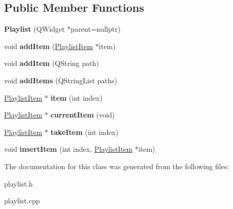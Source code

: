 \subsection*{Public Member Functions}
\begin{DoxyCompactItemize}
\item 
\mbox{\label{classPlaylist_a1a38dac71a234491bc933bd5089c54b0}} 
{\bfseries Playlist} (Q\+Widget $\ast$parent=nullptr)
\item 
\mbox{\label{classPlaylist_a1277d4881eeaad2562ff883fa7b90833}} 
void {\bfseries add\+Item} (\hyperlink{classPlaylistItem}{Playlist\+Item} $\ast$item)
\item 
\mbox{\label{classPlaylist_a1a8512bea74f92bac13d8827dec1a6ac}} 
void {\bfseries add\+Item} (Q\+String path)
\item 
\mbox{\label{classPlaylist_a0b6ccc713cf25550bc5fac2cef666e5d}} 
void {\bfseries add\+Items} (Q\+String\+List paths)
\item 
\mbox{\label{classPlaylist_a31b754a62bccbd79b6a5320d02ca50f3}} 
\hyperlink{classPlaylistItem}{Playlist\+Item} $\ast$ {\bfseries item} (int index)
\item 
\mbox{\label{classPlaylist_a9fb676932435eb9c599d82e1e0e2e919}} 
\hyperlink{classPlaylistItem}{Playlist\+Item} $\ast$ {\bfseries current\+Item} (void)
\item 
\mbox{\label{classPlaylist_af38010d3b29b01bfd4e06a25a9f91484}} 
\hyperlink{classPlaylistItem}{Playlist\+Item} $\ast$ {\bfseries take\+Item} (int index)
\item 
\mbox{\label{classPlaylist_a8d9b899e88674cde1d6158cef5244c96}} 
void {\bfseries insert\+Item} (int index, \hyperlink{classPlaylistItem}{Playlist\+Item} $\ast$item)
\end{DoxyCompactItemize}


The documentation for this class was generated from the following files\+:\begin{DoxyCompactItemize}
\item 
playlist.\+h\item 
playlist.\+cpp\end{DoxyCompactItemize}
